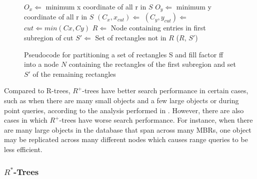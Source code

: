 \begin{figure}
\begin{algorithmic}
		\EndIf
		\State $O_{x} \Leftarrow$ minimum x coordinate of all r in $S$
		\State $O_{y} \Leftarrow$ minimum y coordinate of all r in $S$
		\State $(C_{x}, x_{cut}) \Leftarrow$ 
		\State $(C_{y}, y_{cut}) \Leftarrow$ 
		\State $cut \Leftarrow min(Cx, Cy)$
		\State $R \Leftarrow$ Node containing entries in first subregion of cut
		\State $S' \Leftarrow$ Set of rectangles not in $R$ 
		\Return ($R$, $S'$)
	\EndFunction
\end{algorithmic}
\caption{Pseudocode for partitioning a set of rectangles S and fill factor ff into
	a node $N$ containing the rectangles of the first subregion and set $S'$ of
	the remaining rectangles}
\label{fig:R+_Tree_Partition}
\end{figure}


Compared to R-trees, $R^{+}$-trees have better search performance in certain cases,
such as when there are many small objects and a few large objects or during point 
queries, according to the analysis performed in \cite{sellisroussopoulosfaloutsos87}. 
However, there are also cases in which $R^{+}$-trees have worse search performance. 
For instance, when there are many large objects in the database that span across many
MBRs, one object may be replicated across many different nodes which causes range
queries to be less efficient.

\subsubsection{$R^{*}$-Trees}





